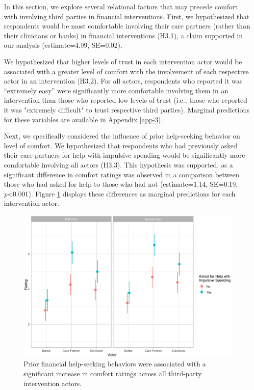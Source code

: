 \documentclass[10pt]{article}
\begin{document}
In this section, we explore several relational factors that may precede comfort with involving third parties in financial interventions. First, we hypothesized that respondents would be most comfortable involving their care partners (rather than their clinicians or banks) in financial interventions (H3.1), a claim supported in our analysis (estimate=4.99, SE=0.02).

We hypothesized that higher levels of trust in each intervention actor would be associated with a greater level of comfort with the involvement of each respective actor in an intervention (H3.2). For all actors, respondents who reported it was ``extremely easy'' were significantly more comfortable involving them in an intervention than those who reported low levels of trust (i.e., those who reported it was "extremely difficult" to trust respective third parties). Marginal predictions for these variables are available in Appendix \ref{app-3}.

Next, we specifically considered the influence of prior help-seeking behavior on level of comfort. We hypothesized that respondents who had previously asked their care partners for help with impulsive spending would be significantly more comfortable involving all actors (H3.3). This hypothesis was supported, as a significant difference in comfort ratings was observed in a comparison between those who had asked for help to those who had not (estimate=1.14, SE=0.19, \emph{p}\textless0.001). Figure \ref{fig:expl_interaction_carepartnerhelp_actors_moodstate} displays these differences as marginal predictions for each intervention actor. 

\begin{figure}[!ht]
  \centering
  \includegraphics[scale=0.5]{figures/expl_interaction_carepartnerhelp_actors_moodstate.eps}
  \caption{Prior financial help-seeking behaviors were associated with a significant increase in comfort ratings across all third-party intervention actors.}
  \label{fig:expl_interaction_carepartnerhelp_actors_moodstate}
\end{figure}
\end{document}
